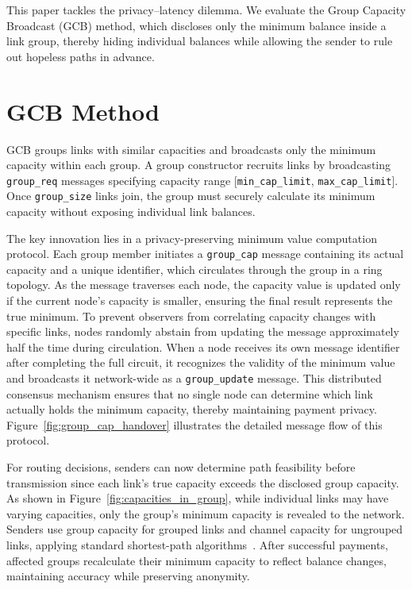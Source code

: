 \documentclass[conference]{IEEEtran}
\newcommand{\groupcap}{\texttt{group\_cap}}
\newcommand{\groupupdate}{\texttt{group\_update}}
\newcommand{\groupreq}{\texttt{group\_req}}
\newcommand{\groupsize}{\texttt{group\_size}}
\newcommand{\mincaplimit}{\texttt{min\_cap\_limit}}
\newcommand{\maxcaplimit}{\texttt{max\_cap\_limit}}
\begin{document}
This paper tackles the privacy–latency dilemma.  We evaluate the Group Capacity Broadcast (GCB) method, which discloses only the minimum balance inside a link group, thereby hiding individual balances while allowing the sender to rule out hopeless paths in advance.

\section{GCB Method}

GCB groups links with similar capacities and broadcasts only the minimum capacity within each group. A group constructor recruits links by broadcasting \groupreq{} messages specifying capacity range [\mincaplimit{}, \maxcaplimit{}]. Once \groupsize{} links join, the group must securely calculate its minimum capacity without exposing individual link balances.

The key innovation lies in a privacy-preserving minimum value computation protocol. Each group member initiates a \groupcap{} message containing its actual capacity and a unique identifier, which circulates through the group in a ring topology. As the message traverses each node, the capacity value is updated only if the current node's capacity is smaller, ensuring the final result represents the true minimum. To prevent observers from correlating capacity changes with specific links, nodes randomly abstain from updating the message approximately half the time during circulation. When a node receives its own message identifier after completing the full circuit, it recognizes the validity of the minimum value and broadcasts it network-wide as a \groupupdate{} message. This distributed consensus mechanism ensures that no single node can determine which link actually holds the minimum capacity, thereby maintaining payment privacy. Figure~\ref{fig:group_cap_handover} illustrates the detailed message flow of this protocol.

For routing decisions, senders can now determine path feasibility before transmission since each link's true capacity exceeds the disclosed group capacity. As shown in Figure~\ref{fig:capacities_in_group}, while individual links may have varying capacities, only the group's minimum capacity is revealed to the network. Senders use group capacity for grouped links and channel capacity for ungrouped links, applying standard shortest-path algorithms~\cite{lnd,eclair,clightning}. After successful payments, affected groups recalculate their minimum capacity to reflect balance changes, maintaining accuracy while preserving anonymity.
\end{document}

